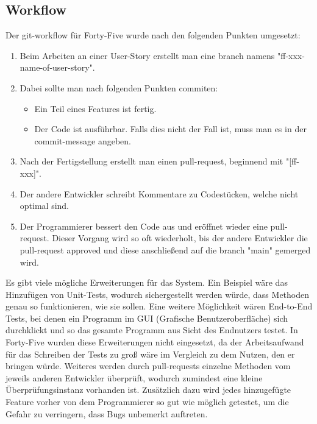 \renewcommand{\kapitelautor}{Autor: Felix Zwickelstorfer}
\subsection{Workflow}\label{subsec:workflow}

Der git-workflow für Forty-Five wurde nach den folgenden Punkten umgesetzt:
\begin{enumerate}
    \item Beim Arbeiten an einer User-Story erstellt man eine branch namens "ff-xxx-name-of-user-story".
    \item Dabei sollte man nach folgenden Punkten commiten:
    \begin{itemize}
        \item Ein Teil eines Features ist fertig.
        \item Der Code ist ausführbar.
            Falls dies nicht der Fall ist, muss man es in der commit-message angeben.
    \end{itemize}
    \item Nach der Fertigstellung erstellt man einen pull-request, beginnend mit "[ff-xxx]".
    \item Der andere Entwickler schreibt Kommentare zu Codestücken, welche nicht optimal sind.
    \item Der Programmierer bessert den Code aus und eröffnet wieder eine pull-request.
        Dieser Vorgang wird so oft wiederholt, bis der andere Entwickler die pull-request approved und diese anschließend auf die branch "main" gemerged wird.
\end{enumerate}

Es gibt viele mögliche Erweiterungen für das System.
Ein Beispiel wäre das Hinzufügen von Unit-Tests, wodurch sichergestellt werden würde, dass Methoden genau so funktionieren, wie sie sollen.
Eine weitere Möglichkeit wären End-to-End Tests, bei denen ein Programm im GUI (Grafische Benutzeroberfläche) sich durchklickt und so das gesamte Programm aus Sicht des Endnutzers testet.
In Forty-Five wurden diese Erweiterungen nicht eingesetzt, da der Arbeitsaufwand für das Schreiben der Tests zu groß wäre im Vergleich zu dem Nutzen, den er bringen würde.
Weiteres werden durch pull-requests einzelne Methoden vom jeweils anderen Entwickler überprüft, wodurch zumindest eine kleine Überprüfungsinstanz vorhanden ist.
Zusätzlich dazu wird jedes hinzugefügte Feature vorher von dem Programmierer so gut wie möglich getestet, um die Gefahr zu verringern, dass Bugs unbemerkt auftreten.